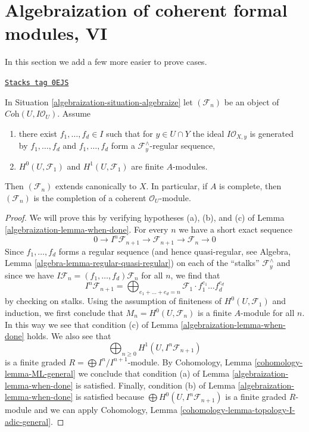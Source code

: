 \section{Algebraization of coherent formal modules, VI}
\label{algebraization-section-algebraization-modules-yet-more}
In this section we add a few more easier to prove cases.

\begin{proposition}
\label{algebraization-proposition-algebraization-regular-sequence}
\href{https://stacks.math.columbia.edu/tag/0EJS}{\texttt{Stacks tag 0EJS}}

In Situation \ref{algebraization-situation-algebraize} let
$(\mathcal{F}_n)$ be an object of $\textit{Coh}(U, I\mathcal{O}_U)$.
Assume
\begin{enumerate}
\item there exist $f_1, \ldots, f_d \in I$ such that
for $y \in U \cap Y$ the ideal $I\mathcal{O}_{X, y}$
is generated by $f_1, \ldots, f_d$ and
$f_1, \ldots, f_d$ form a $\mathcal{F}_y^\wedge$-regular sequence,
\item $H^0(U, \mathcal{F}_1)$ and $H^1(U, \mathcal{F}_1)$
are finite $A$-modules.
\end{enumerate}
Then $(\mathcal{F}_n)$ extends canonically to $X$. In particular, if $A$
is complete, then $(\mathcal{F}_n)$ is the completion of a coherent
$\mathcal{O}_U$-module.
\end{proposition}

\begin{proof}

We will prove this by verifying hypotheses (a), (b), and (c) of
Lemma \ref{algebraization-lemma-when-done}.
For every $n$ we have a short exact sequence
$$
0 \to I^n\mathcal{F}_{n + 1} \to \mathcal{F}_{n + 1} \to \mathcal{F}_n \to 0
$$
Since $f_1, \ldots, f_d$ forms a regular sequence (and hence
quasi-regular, see Algebra, Lemma \ref{algebra-lemma-regular-quasi-regular})
on each of the ``stalks'' $\mathcal{F}_y^\wedge$ and since we have
$I\mathcal{F}_n = (f_1, \ldots, f_d)\mathcal{F}_n$ for all $n$,
we find that
$$
I^n\mathcal{F}_{n + 1} =
\bigoplus\nolimits_{e_1 + \ldots + e_d = n} \mathcal{F}_1 \cdot
f_1^{e_1} \ldots f_d^{e_d}
$$
by checking on stalks. Using the assumption of finiteness of
$H^0(U, \mathcal{F}_1)$ and induction, we first conclude that
$M_n = H^0(U, \mathcal{F}_n)$ is a finite $A$-module for all $n$.
In this way we see that condition (c) of Lemma \ref{algebraization-lemma-when-done} holds.
We also see that
$$
\bigoplus\nolimits_{n \geq 0} H^1(U, I^n\mathcal{F}_{n + 1})
$$
is a finite graded $R = \bigoplus I^n/I^{n +1}$-module.
By Cohomology, Lemma \ref{cohomology-lemma-ML-general}
we conclude that condition (a) of
Lemma \ref{algebraization-lemma-when-done} is satisfied. Finally, condition (b) of
Lemma \ref{algebraization-lemma-when-done} is satisfied because
$\bigoplus H^0(U, I^n\mathcal{F}_{n + 1})$ is a finite graded $R$-module
and we can apply
Cohomology, Lemma \ref{cohomology-lemma-topology-I-adic-general}.
\end{proof}

